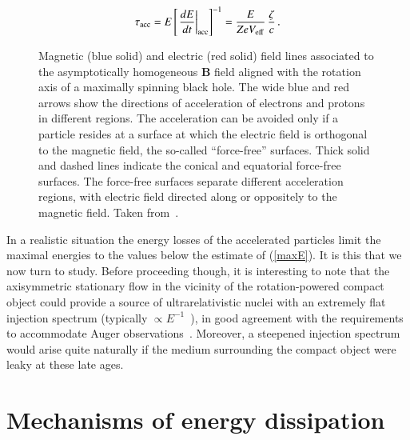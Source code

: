 \documentclass[aps,prd,twocolumn,superscriptaddress,tightenlines,nofootinbib]{revtex4-1}
\newcommand{\postscript}[2]{\setlength{\epsfxsize}{#2\hsize}
   \centerline{\epsfbox{#1}}}
\begin{document}
\begin{equation}
\tau_{\rm acc}  = E \left[\left. \frac{dE}{dt}
  \right|_{\rm acc} \right]^{-1} = \frac{E}{Z e V_{\rm eff}}  \,  \frac{\zeta}{c} \, .
\label{muddler}
\end{equation}
\begin{figure}
\postscript{fields}{0.9}
\caption{Magnetic (blue solid) and electric (red solid) field lines
  associated to the asymptotically homogeneous $\bm{B}$ field aligned
  with the rotation axis of a maximally spinning black hole. The wide
  blue and red arrows show the directions of acceleration of electrons
  and protons in different regions. The acceleration can be avoided
  only if a particle resides at a surface at which the electric field
  is orthogonal to the magnetic field, the so-called “force-free”
  surfaces.  Thick solid and dashed lines indicate the conical and
  equatorial force-free surfaces. The force-free surfaces separate
  different acceleration regions, with electric field directed along
  or oppositely to the magnetic field. Taken
  from~\cite{Neronov:2007mh}.}
\label{fig:field-lines}
\end{figure}

In a realistic situation the energy losses of the accelerated
particles limit the maximal energies to the values below the estimate
of (\ref{maxE}). It is this that we now turn to study. Before
proceeding though, it is interesting to note that the axisymmetric
stationary flow in the vicinity of the rotation-powered compact object
could provide a source of ultrarelativistic nuclei with an extremely
flat injection spectrum (typically $\propto
E^{-1}$~\cite{Blasi:2000xm,Kotera:2015pya}), in good agreement with
the requirements  to
accommodate  Auger
observations~\cite{Aab:2016zth,Unger:2015laa}. Moreover, a steepened
injection spectrum would arise quite naturally if the medium
surrounding the compact object were leaky at these late ages.




\section{Mechanisms of energy dissipation}
\label{sec:4}
\end{document}
